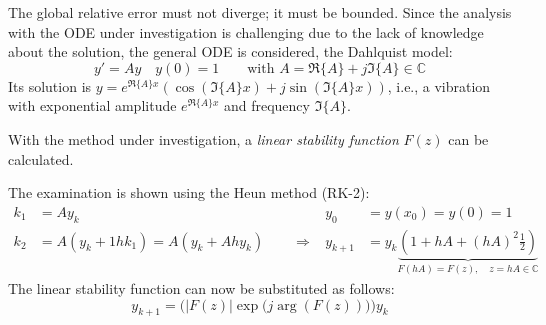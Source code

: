   The global relative error must not diverge; it must be bounded. Since the analysis with the ODE under investigation is challenging due to the lack of knowledge about the solution, the general ODE is considered, the Dahlquist model:
  $$y' = A y \quad y(0) = 1 \qquad \text{with } A = \Re\{A\} + j \Im\{A\} \in \mathbb{C}$$
  Its solution is $y = e^{\Re\{A\} x} \left( \cos(\Im\{A\}x) + j \sin(\Im\{A\} x) \right)$, i.e., a vibration with exponential amplitude $e^{\Re\{A\} x}$ and frequency $\Im\{A\}$.

  With the method under investigation, a \emph{linear stability function} $F(z)$ can be calculated.

   The examination is shown using the Heun method (RK-2):
  \begin{align*}
      k_1 &= A y_k                                          & y_0 &= y(x_0) = y(0) = 1\\
      k_2 &= A(y_k + 1 h k_1) = A(y_k + Ah y_k) \qquad \Longrightarrow &
      y_{k+1} &= y_k \underbrace{\left(1 + hA + (hA)^2 \frac12\right)}_{F(hA) = F(z), \quad z=hA \in \mathbb{C}}
  \end{align*}
  The linear stability function can now be substituted as follows:
  $$y_{k+1} = \Big( | F(z) | \exp \big(j \arg(F(z))\big) \Big) y_k$$

